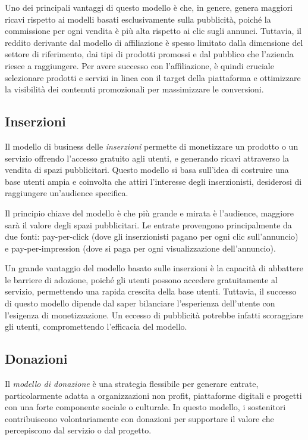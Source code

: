 Uno dei principali vantaggi di questo modello è che, in genere, genera maggiori ricavi rispetto ai modelli basati esclusivamente sulla pubblicità, poiché la commissione per ogni vendita è più alta rispetto ai clic sugli annunci. Tuttavia, il reddito derivante dal modello di affiliazione è spesso limitato dalla dimensione del settore di riferimento, dai tipi di prodotti promossi e dal pubblico che l’azienda riesce a raggiungere. Per avere successo con l’affiliazione, è quindi cruciale selezionare prodotti e servizi in linea con il target della piattaforma e ottimizzare la visibilità dei contenuti promozionali per massimizzare le conversioni.

\subsection*{Inserzioni}
Il modello di business delle \textit{inserzioni} permette di monetizzare un prodotto o un servizio offrendo l’accesso gratuito agli utenti, e generando ricavi attraverso la vendita di spazi pubblicitari. Questo modello si basa sull’idea di costruire una base utenti ampia e coinvolta che attiri l’interesse degli inserzionisti, desiderosi di raggiungere un’audience specifica.

Il principio chiave del modello è che più grande e mirata è l’audience, maggiore sarà il valore degli spazi pubblicitari. Le entrate provengono principalmente da due fonti: pay-per-click (dove gli inserzionisti pagano per ogni clic sull'annuncio) e pay-per-impression (dove si paga per ogni visualizzazione dell’annuncio).

Un grande vantaggio del modello basato sulle inserzioni è la capacità di abbattere le barriere di adozione, poiché gli utenti possono accedere gratuitamente al servizio, permettendo una rapida crescita della base utenti. Tuttavia, il successo di questo modello dipende dal saper bilanciare l’esperienza dell’utente con l’esigenza di monetizzazione. Un eccesso di pubblicità potrebbe infatti scoraggiare gli utenti, compromettendo l’efficacia del modello.

\subsection*{Donazioni}
Il \textit{modello di donazione} è una strategia flessibile per generare entrate, particolarmente adatta a organizzazioni non profit, piattaforme digitali e progetti con una forte componente sociale o culturale. In questo modello, i sostenitori contribuiscono volontariamente con donazioni per supportare il valore che percepiscono dal servizio o dal progetto.

